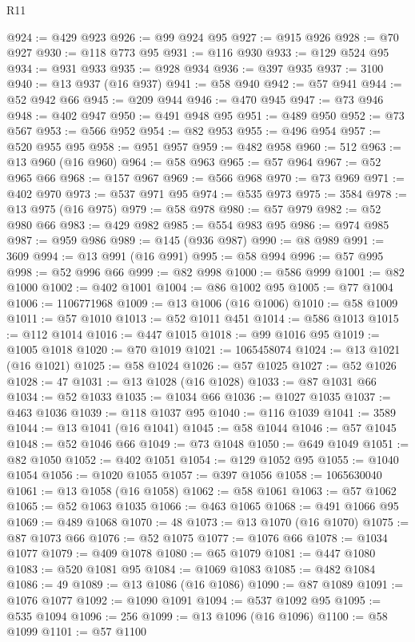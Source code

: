 \begin{lexlean}{R11}
\begin{coremodule}
@924 := @429 @923
@926 := @99 @924 @95
@927 := @915 @926
@928 := @70 @927
@930 := @118 @773 @95
@931 := @116 @930
@933 := @129 @524 @95
@934 := @931 @933
@935 := @928 @934
@936 := @397 @935
@937 := 3100
@940 := @13 @937 (@16 @937)
@941 := @58 @940
@942 := @57 @941
@944 := @52 @942 @66
@945 := @209 @944
@946 := @470 @945
@947 := @73 @946
@948 := @402 @947
@950 := @491 @948 @95
@951 := @489 @950
@952 := @73 @567
@953 := @566 @952
@954 := @82 @953
@955 := @496 @954
@957 := @520 @955 @95
@958 := @951 @957
@959 := @482 @958
@960 := 512
@963 := @13 @960 (@16 @960)
@964 := @58 @963
@965 := @57 @964
@967 := @52 @965 @66
@968 := @157 @967
@969 := @566 @968
@970 := @73 @969
@971 := @402 @970
@973 := @537 @971 @95
@974 := @535 @973
@975 := 3584
@978 := @13 @975 (@16 @975)
@979 := @58 @978
@980 := @57 @979
@982 := @52 @980 @66
@983 := @429 @982
@985 := @554 @983 @95
@986 := @974 @985
@987 := @959 @986
@989 := @145 (@936 @987)
@990 := @8 @989
@991 := 3609
@994 := @13 @991 (@16 @991)
@995 := @58 @994
@996 := @57 @995
@998 := @52 @996 @66
@999 := @82 @998
@1000 := @586 @999
@1001 := @82 @1000
@1002 := @402 @1001
@1004 := @86 @1002 @95
@1005 := @77 @1004
@1006 := 1106771968
@1009 := @13 @1006 (@16 @1006)
@1010 := @58 @1009
@1011 := @57 @1010
@1013 := @52 @1011 @451
@1014 := @586 @1013
@1015 := @112 @1014
@1016 := @447 @1015
@1018 := @99 @1016 @95
@1019 := @1005 @1018
@1020 := @70 @1019
@1021 := 1065458074
@1024 := @13 @1021 (@16 @1021)
@1025 := @58 @1024
@1026 := @57 @1025
@1027 := @52 @1026
@1028 := 47
@1031 := @13 @1028 (@16 @1028)
@1033 := @87 @1031 @66
@1034 := @52 @1033
@1035 := @1034 @66
@1036 := @1027 @1035
@1037 := @463 @1036
@1039 := @118 @1037 @95
@1040 := @116 @1039
@1041 := 3589
@1044 := @13 @1041 (@16 @1041)
@1045 := @58 @1044
@1046 := @57 @1045
@1048 := @52 @1046 @66
@1049 := @73 @1048
@1050 := @649 @1049
@1051 := @82 @1050
@1052 := @402 @1051
@1054 := @129 @1052 @95
@1055 := @1040 @1054
@1056 := @1020 @1055
@1057 := @397 @1056
@1058 := 1065630040
@1061 := @13 @1058 (@16 @1058)
@1062 := @58 @1061
@1063 := @57 @1062
@1065 := @52 @1063 @1035
@1066 := @463 @1065
@1068 := @491 @1066 @95
@1069 := @489 @1068
@1070 := 48
@1073 := @13 @1070 (@16 @1070)
@1075 := @87 @1073 @66
@1076 := @52 @1075
@1077 := @1076 @66
@1078 := @1034 @1077
@1079 := @409 @1078
@1080 := @65 @1079
@1081 := @447 @1080
@1083 := @520 @1081 @95
@1084 := @1069 @1083
@1085 := @482 @1084
@1086 := 49
@1089 := @13 @1086 (@16 @1086)
@1090 := @87 @1089
@1091 := @1076 @1077
@1092 := @1090 @1091
@1094 := @537 @1092 @95
@1095 := @535 @1094
@1096 := 256
@1099 := @13 @1096 (@16 @1096)
@1100 := @58 @1099
@1101 := @57 @1100

\end{coremodule}
\end{lexlean}
